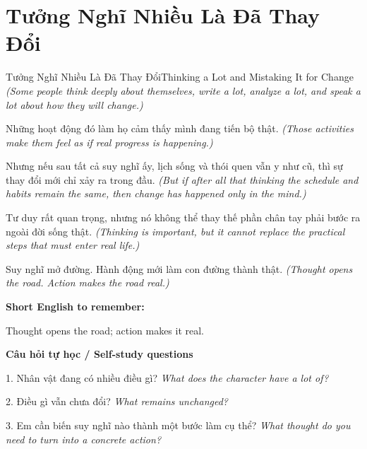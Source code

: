 \section{Tưởng Nghĩ Nhiều Là Đã Thay Đổi}
\begin{truyen}{Tưởng Nghĩ Nhiều Là Đã Thay Đổi}{Thinking a Lot and Mistaking It for Change}
\textit{(Some people think deeply about themselves, write a lot, analyze a lot, and speak a lot about how they will change.)}

Những hoạt động đó làm họ cảm thấy mình đang tiến bộ thật.
\textit{(Those activities make them feel as if real progress is happening.)}

Nhưng nếu sau tất cả suy nghĩ ấy, lịch sống và thói quen vẫn y như cũ, thì sự thay đổi mới chỉ xảy ra trong đầu.
\textit{(But if after all that thinking the schedule and habits remain the same, then change has happened only in the mind.)}

Tư duy rất quan trọng, nhưng nó không thể thay thế phần chân tay phải bước ra ngoài đời sống thật.
\textit{(Thinking is important, but it cannot replace the practical steps that must enter real life.)}

\end{truyen}

\begin{baihoc}
Suy nghĩ mở đường. Hành động mới làm con đường thành thật.
\textit{(Thought opens the road. Action makes the road real.)}
\end{baihoc}

\begin{ghinhoanh}
\textbf{Short English to remember:}

Thought opens the road; action makes it real.

\end{ghinhoanh}

\begin{tuhocnhanh}
\textbf{Câu hỏi tự học / Self-study questions}

1. Nhân vật đang có nhiều điều gì? \textit{What does the character have a lot of?}

2. Điều gì vẫn chưa đổi? \textit{What remains unchanged?}

3. Em cần biến suy nghĩ nào thành một bước làm cụ thể? \textit{What thought do you need to turn into a concrete action?}
\end{tuhocnhanh}
\ngancach

